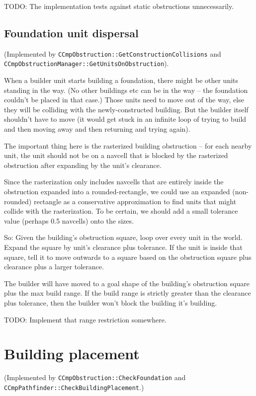 \documentclass[a4paper,10pt]{article}
\begin{document}
TODO: The implementation tests against static obstructions unnecessarily.

\subsection{Foundation unit dispersal}

(Implemented by \texttt{CCmpObstruction::GetConstructionCollisions}
and \texttt{CCmpObstructionManager::GetUnitsOnObstruction}).

When a builder unit starts building a foundation,
there might be other units standing in the way.
(No other buildings etc can be in the way -- the foundation couldn't be placed in that case.)
Those units need to move out of the way,
else they will be colliding with the newly-constructed building.
But the builder itself shouldn't have to move
(it would get stuck in an infinite loop of trying to build and then moving away and then returning and trying again).

The important thing here is the rasterized building obstruction --
for each nearby unit, the unit should not be on a navcell that is blocked
by the rasterized obstruction after expanding by the unit's clearance.

Since the rasterization only includes navcells that are entirely inside the
obstruction expanded into a rounded-rectangle,
we could use an expanded (non-rounded) rectangle as a conservative approximation
to find units that might collide with the rasterization.
To be certain, we should add a small tolerance value (perhaps 0.5 navcells) onto the sizes.

So: Given the building's obstruction square, loop over every unit in the world.
Expand the square by unit's clearance plus tolerance. If the unit is inside that
square, tell it to move outwards to a square based on the obstruction square plus
clearance plus a larger tolerance.

The builder will have moved to a goal shape of the building's obstruction square
plus the max build range.
If the build range is strictly greater than the clearance plus tolerance,
then the builder won't block the building it's building.

TODO: Implement that range restriction somewhere.

\section{Building placement}

(Implemented by \texttt{CCmpObstruction::CheckFoundation}
and \texttt{CCmpPathfinder::CheckBuildingPlacement}.)
\end{document}
